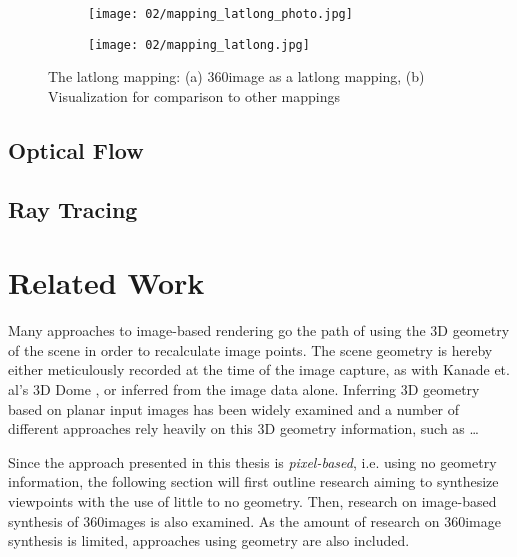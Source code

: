 \begin{figure}
    \quad
    \begin{subfigure}[b]{0.5\textwidth}            
            \centering
            \texttt{[image: 02/mapping\_latlong\_photo.jpg]}
            \caption{}
    \end{subfigure}%
    \begin{subfigure}[b]{0.5\textwidth}
            \centering
            \texttt{[image: 02/mapping\_latlong.jpg]}
            \caption{}
    \end{subfigure}
    \caption[Latlong mapping]{The latlong mapping: (a) 360\degree image as a latlong mapping, (b) Visualization for comparison to other mappings}\label{fig:latlong-intro}
  \end{figure}

\subsection{Optical Flow}
\subsection{Ray Tracing}

\section{Related Work}
Many approaches to image-based rendering go the path of using the 3D geometry of the scene in order to recalculate image points. The scene geometry is hereby either meticulously recorded at the time of the image capture, as with Kanade et. al's 3D Dome \cite{geometry97}, or inferred from the image data alone. Inferring 3D geometry based on planar input images has been widely examined \cite{hartley_zisserman_2004} and a number of different approaches rely heavily on this 3D geometry information, such as \ldots

Since the approach presented in this thesis is \emph{pixel-based}, i.e. using no geometry information, the following section will first outline research aiming to synthesize viewpoints with the use of little to no geometry. Then, research on image-based synthesis of 360\degree images is also examined. As the amount of research on 360\degree image synthesis is limited, approaches using geometry are also included.


